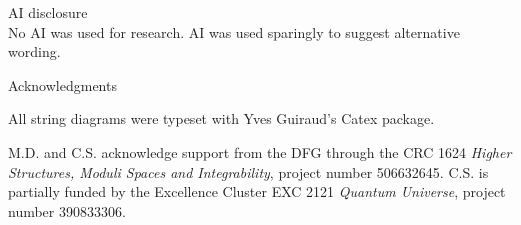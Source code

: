 \documentclass[reqno,12pt]{amsart}
\begin{document}
\begin{center}
	\sc AI disclosure\\[.5em]
	\normalfont No AI was used for research. AI was used sparingly to suggest alternative wording.
\end{center}

\medskip

\begin{center}
	\sc Acknowledgments\\[.5em]
\end{center}
All string diagrams were typeset with Yves Guiraud’s Catex package.

M.D. and C.S. acknowledge support from the DFG through the CRC 1624 \emph{Higher Structures, Moduli Spaces and Integrability}, project number 506632645. C.S. is partially funded by the Excellence Cluster EXC 2121 \emph{Quantum Universe}, project number 390833306.



\end{document}
